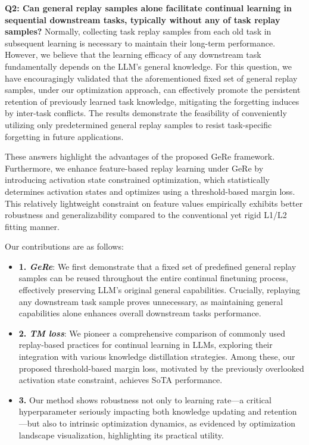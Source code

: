 \noindent
\textbf{Q2: Can general replay samples alone facilitate continual learning in sequential downstream tasks, typically without any of task replay samples?}
Normally, collecting task replay samples from each old task in subsequent learning is necessary to maintain their long-term performance. However, we believe that the learning  efficacy of any downstream task fundamentally depends on the LLM's general knowledge. For this question, we have encouragingly validated that the aforementioned fixed set of general replay samples, under our optimization approach, can effectively promote the persistent retention of previously learned task knowledge, mitigating the forgetting induces by inter-task conflicts.
The results demonstrate the feasibility of conveniently utilizing only predetermined general replay samples to resist task-specific forgetting in future applications.

These answers highlight the advantages of the proposed GeRe framework. Furthermore, we enhance feature-based replay learning under GeRe by introducing activation state constrained optimization, which statistically determines activation states and optimizes using a threshold-based margin loss. This relatively lightweight constraint on feature values empirically exhibits better robustness and generalizability compared to the conventional yet rigid L1/L2 fitting manner.

Our contributions are as follows:
\begin{itemize}[leftmargin=*, align=left]

\item \textbf{1. \textit{GeRe}}: We first demonstrate that a fixed set of predefined general replay samples can be reused throughout the entire continual finetuning process, effectively preserving LLM's original general capabilities. Crucially, replaying any downstream task sample proves unnecessary, as maintaining general capabilities alone enhances overall downstream tasks performance.

\item \textbf{2. \textit{TM loss}}: We pioneer a comprehensive comparison of commonly used replay-based practices for continual learning in LLMs, exploring their integration with various knowledge distillation strategies. Among these, our proposed threshold-based margin loss, motivated by the previously overlooked activation state constraint, achieves SoTA performance.

\item \textbf{3.}
Our method shows robustness not only to learning rate---a critical hyperparameter seriously impacting both knowledge updating and retention---but also to intrinsic optimization dynamics, as evidenced by optimization landscape visualization, highlighting its practical utility.

\end{itemize}

